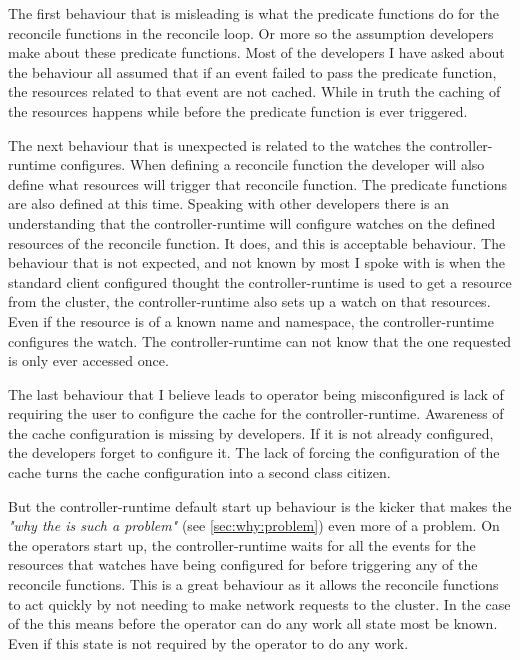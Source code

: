The first behaviour that is misleading is what the predicate functions do for the reconcile functions in the reconcile loop.
Or more so the assumption developers make about these predicate functions.
Most of the developers I have asked about the behaviour all assumed that if an event failed to pass the predicate function, the resources related to that event are not cached.
While in truth the caching of the resources happens while before the predicate function is ever triggered.

The next behaviour that is unexpected is related to the watches the controller-runtime configures.
When defining a reconcile function the developer will also define what resources will trigger that reconcile function.
The predicate functions are also defined at this time.
Speaking with other developers there is an understanding that the controller-runtime will configure watches on the defined resources of the reconcile function.
It does, and this is acceptable behaviour.
The behaviour that is not expected, and not known by most I spoke with is when the standard client configured thought the controller-runtime is used to get a resource from the cluster, the controller-runtime also sets up a watch on that resources.
Even if the resource is of a known name and namespace, the controller-runtime configures the watch.
The controller-runtime can not know that the one requested is only ever accessed once.

The last behaviour that I believe leads to operator being misconfigured is lack of requiring the user to configure the cache for the controller-runtime.
Awareness of the cache configuration is missing by developers.
If it is not already configured, the developers forget to configure it.
The lack of forcing the configuration of the cache turns the cache configuration into a second class citizen.

\label{sec:why:controller-runtime:startup}
But the controller-runtime default start up behaviour is the kicker that makes the \textit{"why the \nn{} is such a problem"} (see \cref{sec:why:problem}) even more of a problem.
On the operators start up, the controller-runtime waits for all the events for the resources that watches have being configured for before triggering any of the reconcile functions.
This is a great behaviour as it allows the reconcile functions to act quickly by not needing to make network requests to the cluster.
In the case of the \nn{} this means before the operator can do any work all state most be known.
Even if this state is not required by the operator to do any work.

